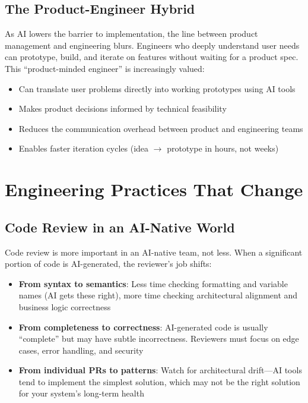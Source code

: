 \subsection{The Product-Engineer Hybrid}

As AI lowers the barrier to implementation, the line between product management and engineering blurs. Engineers who deeply understand user needs can prototype, build, and iterate on features without waiting for a product spec. This ``product-minded engineer'' is increasingly valued:

\begin{itemize}[leftmargin=*]
    \item Can translate user problems directly into working prototypes using AI tools
    \item Makes product decisions informed by technical feasibility
    \item Reduces the communication overhead between product and engineering teams
    \item Enables faster iteration cycles (idea $\to$ prototype in hours, not weeks)
\end{itemize}


\section{Engineering Practices That Change}

\subsection{Code Review in an AI-Native World}

Code review is more important in an AI-native team, not less. When a significant portion of code is AI-generated, the reviewer's job shifts:

\begin{itemize}[leftmargin=*]
    \item \textbf{From syntax to semantics}: Less time checking formatting and variable names (AI gets these right), more time checking architectural alignment and business logic correctness
    \item \textbf{From completeness to correctness}: AI-generated code is usually ``complete'' but may have subtle incorrectness. Reviewers must focus on edge cases, error handling, and security
    \item \textbf{From individual PRs to patterns}: Watch for architectural drift---AI tools tend to implement the simplest solution, which may not be the right solution for your system's long-term health
\end{itemize}

